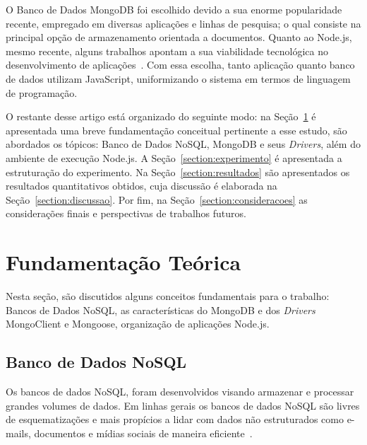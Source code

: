 \documentclass[12pt]{article}
\begin{document}
O Banco de Dados MongoDB foi escolhido devido a sua enorme popularidade recente, empregado em diversas aplicações e linhas de pesquisa; o qual consiste na principal opção de armazenamento orientada a documentos. %
Quanto ao Node.js, mesmo recente, alguns trabalhos apontam a sua viabilidade tecnológica no desenvolvimento de aplicações~\cite{chaniotis2015node}. 
Com essa escolha, tanto aplicação quanto banco de dados utilizam JavaScript, uniformizando o sistema em termos de linguagem de programação.

O restante desse artigo está organizado do seguinte modo: na Seção~\ref{section:fundamentacao} é apresentada uma breve fundamentação conceitual pertinente a esse estudo, são abordados os tópicos: Banco de Dados NoSQL, MongoDB e seus \emph{Drivers}, além do ambiente de execução Node.js. 
A Seção~\ref{section:experimento} é apresentada a estruturação do experimento. 
Na Seção~\ref{section:resultados} são apresentados os resultados quantitativos obtidos, cuja discussão é elaborada na Seção~\ref{section:discussao}. 
Por fim, na Seção~\ref{section:consideracoes} as considerações finais e perspectivas de trabalhos futuros.

\section{Fundamentação Teórica}
\label{section:fundamentacao}

Nesta seção, são discutidos alguns conceitos fundamentais para o trabalho: Bancos de Dados NoSQL, as características do MongoDB e dos \emph{Drivers} MongoClient e Mongoose, organização de aplicações Node.js. 

\subsection{Banco de Dados NoSQL}
\label{subsection:nao-relacional}

Os bancos de dados NoSQL, foram desenvolvidos visando armazenar e processar grandes volumes de dados. Em linhas gerais os bancos de dados NoSQL são livres de esquematizações e mais propícios a lidar com dados não estruturados como e-mails, documentos e mídias sociais de maneira eficiente~\cite{mohamed:2014,ramesh:2016}.
\end{document}
